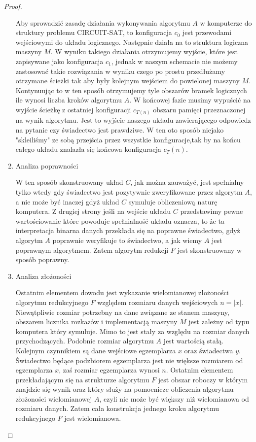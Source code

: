 \begin{proof}
\begin{enumerate}
Aby sprowadzić zasadę działania wykonywania algorytmu $A$ w komputerze do struktury problemu CIRCUIT-SAT, to konfiguracja $c_{0}$ jest przewodami wejściowymi do układu logicznego. Następnie działa na to struktura logiczna maszyny $M$. W wyniku takiego działania otrzymujemy wyjście, które jest zapisywane jako konfiguracja $c_{1}$, jednak w naszym schemacie nie możemy zastosować takie rozwiązania w wyniku czego po prostu przedłużamy otrzymane ścieżki tak aby były kolejnym wejściem do powielonej maszyny $M$. Kontynuując to w ten sposób otrzymujemy tyle obszarów bramek logicznych ile wynosi liczba kroków algorytmu $A$. W końcowej fazie musimy wypuścić na wyjście ścieżkę z ostatniej konfiguracji $c_{T(n)}$ obszaru pamięci przeznaczonej na wynik algorytmu. Jest to wyjście naszego układu zawierającego odpowiedz na pytanie czy świadectwo jest prawdziwe. W ten oto sposób niejako "skleiliśmy" ze sobą przejścia przez wszystkie konfiguracje,tak by na końcu całego układu znalazła się końcowa konfiguracja $c_T(n)$.

\item Analiza poprawności

W ten sposób skonstruowany układ $C$, jak można zauważyć, jest spełnialny tylko wtedy gdy świadectwo jest pozytywnie zweryfikowane przez algorytm $A$, a nie może być inaczej gdyż układ $C$ symuluje obliczeniową naturę komputera. Z drugiej strony jeśli na wejście układu $C$ przedstawimy pewne wartościowanie które powoduje spełnialność układu oznacza, to że ta interpretacja binarna danych przekłada się na poprawne świadectwo, gdyż algorytm $A$ poprawnie weryfikuje to świadectwo, a jak wiemy $A$ jest poprawnym algorytmem. Zatem algorytm redukcji $F$ jest skonstruowany w sposób poprawny.

\item Analiza złożoności

Ostatnim elementem dowodu jest wykazanie wielomianowej złożoności algorytmu redukcyjnego $F$ względem rozmiaru danych wejściowych $n=|x|$. Niewątpliwie rozmiar potrzebny na dane związane ze stanem maszyny, obszarem licznika rozkazów i implementacją maszyny $M$ jest zależny od typu komputera który symuluje. Mimo to jest stały za względu na rozmiar danych przychodzących. Podobnie rozmiar algorytmu $A$ jest wartością stałą. Kolejnym czynnikiem są dane wejściowe egzemplarza $x$ oraz świadectwa $y$. Świadectwo będące podzbiorem egzemplarza jest nie większe rozmiarem od egzemplarza $x$, zaś rozmiar egzemplarza wynosi $n$. Ostatnim elementem przekładającym się na strukturze algorytmu $F$ jest obszar roboczy w którym znajdzie się wynik oraz który służy na pomocnicze obliczenia algorytmu złożoności wielomianowej $A$, czyli nie może być większy niż wielomianowa od rozmiaru danych. Zatem cała konstrukcja jednego kroku algorytmu redukcyjnego $F$ jest wielomianowa.


\end{enumerate}
\end{proof}
